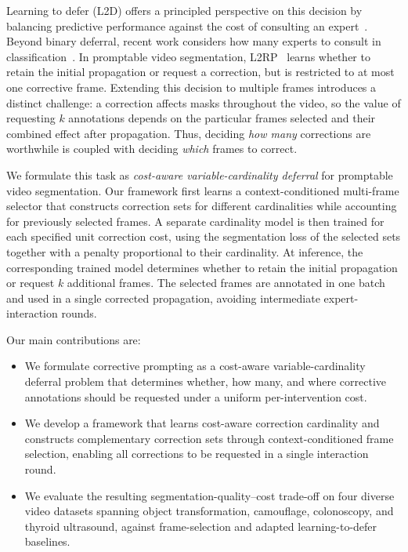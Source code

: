 Learning to defer (L2D) offers a principled perspective on this decision by balancing predictive performance against the cost of consulting an expert~\cite{verma2022calibrated,mozannar2020consistent}. Beyond binary deferral, recent work considers how many experts to consult in classification~\cite{zhang2024learning,montreuil2025ask}. In promptable video segmentation, L2RP~\cite{rasanjalee2026understanding} learns whether to retain the initial propagation or request a correction, but is restricted to at most one corrective frame. Extending this decision to multiple frames introduces a distinct challenge: a correction affects masks throughout the video, so the value of requesting \(k\) annotations depends on the particular frames selected and their combined effect after propagation. Thus, deciding \emph{how many} corrections are worthwhile is coupled with deciding \emph{which} frames to correct.

We formulate this task as \emph{cost-aware variable-cardinality deferral} for promptable video segmentation. Our framework first learns a context-conditioned multi-frame selector that constructs correction sets for different cardinalities while accounting for previously selected frames. A separate cardinality model is then trained for each specified unit correction cost, using the segmentation loss of the selected sets together with a penalty proportional to their cardinality. At inference, the corresponding trained model determines whether to retain the initial propagation or request \(k\) additional frames. The selected frames are annotated in one batch and used in a single corrected propagation, avoiding intermediate expert-interaction rounds.

Our main contributions are:
\begin{itemize}
    \item We formulate corrective prompting as a cost-aware variable-cardinality deferral problem that determines whether, how many, and where corrective annotations should be requested under a uniform per-intervention cost.

    \item We develop a framework that learns cost-aware correction cardinality and constructs complementary correction sets through context-conditioned frame selection, enabling all corrections to be requested in a single interaction round.

    \item We evaluate the resulting segmentation-quality--cost trade-off on four diverse video datasets spanning object transformation, camouflage, colonoscopy, and thyroid ultrasound, against frame-selection and adapted learning-to-defer baselines.
\end{itemize}